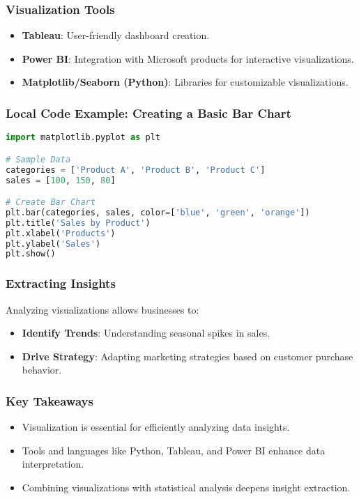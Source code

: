 \documentclass[aspectratio=169]{beamer}
\begin{document}
\begin{frame}[fragile]
    \frametitle{Visualization Tools}
    \begin{itemize}
        \item \textbf{Tableau}: User-friendly dashboard creation.
        \item \textbf{Power BI}: Integration with Microsoft products for interactive visualizations.
        \item \textbf{Matplotlib/Seaborn (Python)}: Libraries for customizable visualizations.
    \end{itemize}
\end{frame}

\begin{frame}[fragile]
    \frametitle{Local Code Example: Creating a Basic Bar Chart}
    \begin{lstlisting}[language=Python]
import matplotlib.pyplot as plt

# Sample Data
categories = ['Product A', 'Product B', 'Product C']
sales = [100, 150, 80]

# Create Bar Chart
plt.bar(categories, sales, color=['blue', 'green', 'orange'])
plt.title('Sales by Product')
plt.xlabel('Products')
plt.ylabel('Sales')
plt.show()
    \end{lstlisting}
\end{frame}

\begin{frame}[fragile]
    \frametitle{Extracting Insights}
    Analyzing visualizations allows businesses to:
    \begin{itemize}
        \item \textbf{Identify Trends}: Understanding seasonal spikes in sales.
        \item \textbf{Drive Strategy}: Adapting marketing strategies based on customer purchase behavior.
    \end{itemize}
\end{frame}

\begin{frame}[fragile]
    \frametitle{Key Takeaways}
    \begin{itemize}
        \item Visualization is essential for efficiently analyzing data insights.
        \item Tools and languages like Python, Tableau, and Power BI enhance data interpretation.
        \item Combining visualizations with statistical analysis deepens insight extraction.
    \end{itemize}
\end{frame}
\end{document}
